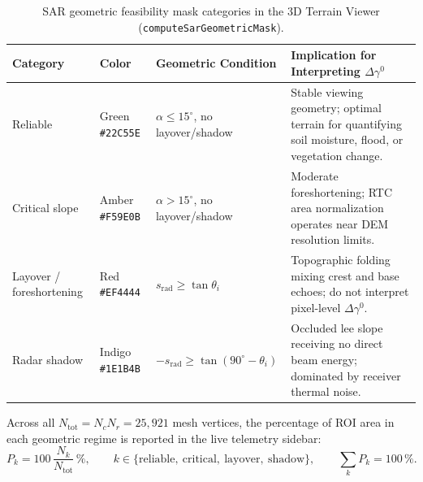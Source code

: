 \documentclass[11pt,a4paper]{article}
\begin{document}
\begin{table}[htbp]
\centering\small
\begin{tabularx}{\linewidth}{p{.23\linewidth}p{.16\linewidth}p{.24\linewidth}X}
\toprule
\textbf{Category} & \textbf{Color} & \textbf{Geometric Condition} & \textbf{Implication for Interpreting $\Delta\gamma^0$}\\\midrule
Reliable & Green \texttt{\#22C55E} & $\alpha \le 15^\circ$, no layover/shadow & Stable viewing geometry; optimal terrain for quantifying soil moisture, flood, or vegetation change.\\
Critical slope & Amber \texttt{\#F59E0B} & $\alpha > 15^\circ$, no layover/shadow & Moderate foreshortening; RTC area normalization operates near DEM resolution limits.\\
Layover / foreshortening & Red \texttt{\#EF4444} & $s_{\mathrm{rad}} \ge \tan\theta_i$ & Topographic folding mixing crest and base echoes; do not interpret pixel-level $\Delta\gamma^0$.\\
Radar shadow & Indigo \texttt{\#1E1B4B} & $-s_{\mathrm{rad}} \ge \tan(90^\circ-\theta_i)$ & Occluded lee slope receiving no direct beam energy; dominated by receiver thermal noise.\\\bottomrule
\end{tabularx}
\caption{SAR geometric feasibility mask categories in the 3D Terrain Viewer (\texttt{computeSarGeometricMask}).}
\label{tab:clases-mascara-sar}
\end{table}

Across all $N_{\mathrm{tot}} = N_c N_r = 25,921$ mesh vertices, the percentage of ROI area in each geometric regime is reported in the live telemetry sidebar:
\begin{equation}
  P_k = 100\,\frac{N_k}{N_{\mathrm{tot}}}\,\mathrm{\%},
  \qquad
  k \in \{\text{reliable},\ \text{critical},\ \text{layover},\ \text{shadow}\},
  \qquad
  \sum_k P_k = 100\,\mathrm{\%}.
  \label{eq:porcentajes-sar}
\end{equation}
\end{document}
